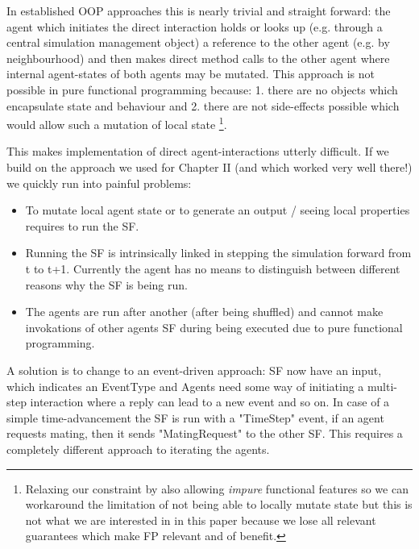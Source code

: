 In established OOP approaches this is nearly trivial and straight forward: the agent which initiates the direct interaction holds or looks up (e.g. through a central simulation management object) a reference to the other agent (e.g. by neighbourhood) and then makes direct method calls to the other agent where internal agent-states of both agents may be mutated.
This approach is not possible in pure functional programming because: 1. there are no objects which encapsulate state and behaviour and 2. there are not side-effects possible which would allow such a mutation of local state \footnote{Relaxing our constraint by also allowing \textit{impure} functional features so we can workaround the limitation of not being able to locally mutate state but this is not what we are interested in in this paper because we lose all relevant guarantees which make FP relevant and of benefit.}. 

This makes implementation of direct agent-interactions utterly difficult.
If we build on the approach we used for Chapter II (and which worked very well there!) we quickly run into painful problems:
\begin{itemize}
	\item To mutate local agent state or to generate an output / seeing local properties requires to run the SF. 
	\item Running the SF is intrinsically linked in stepping the simulation forward from t to t+1. Currently the agent has no means to distinguish between different reasons why the SF is being run.
	\item The agents are run after another (after being shuffled) and cannot make invokations of other agents SF during being executed due to pure functional programming.
\end{itemize}

A solution is to change to an event-driven approach: SF now have an input, which indicates an EventType and Agents need some way of initiating a multi-step interaction where a reply can lead to a new event and so on. In case of a simple time-advancement the SF is run with a "TimeStep" event, if an agent requests mating, then it sends "MatingRequest" to the other SF. This requires a completely different approach to iterating the agents.

